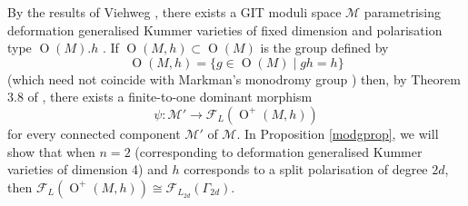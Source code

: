 \documentclass[11pt]{article}
\newcommand{\fc}{\mathcal{F}}
\newcommand{\mc}{\mathcal{M}}
\newcommand{\opn}{\operatorname}
\newcommand{\beq}{\begin{equation*}}
\newcommand{\eeq}{\end{equation*}}
\begin{document}
By the results of Viehweg \cite{Viehweg}, there exists a GIT moduli space $\mc$ parametrising deformation generalised Kummer varieties of fixed dimension and polarisation type $\opn{O}(M). h$ \cite{handbook}.
If $\opn{O}(M, h) \subset \opn{O}(M)$ is the group defined by
\beq
\opn{O}(M, h) = \{g \in \opn{O}(M) \mid gh  = h \}
\eeq
(which need not coincide with Markman's monodromy group \cite{monok3ii,  monok3, intk3,  Mongardi}) then, by Theorem 3.8 of \cite{handbook},  there exists a  finite-to-one dominant morphism
\beq
\psi:\mc' \rightarrow \fc_L(\opn{O}^+(M, h))
\eeq
for every connected component $\mc'$ of $\mc$.
In Proposition \ref{modgprop}, we will show that when $n=2$ (corresponding to deformation generalised Kummer varieties of dimension 4) and $h$ corresponds to a  split polarisation of degree $2d$, then $\fc_L(\opn{O}^+(M, h)) \cong \fc_{L_{2d}}(\Gamma_{2d})$.
\end{document}
